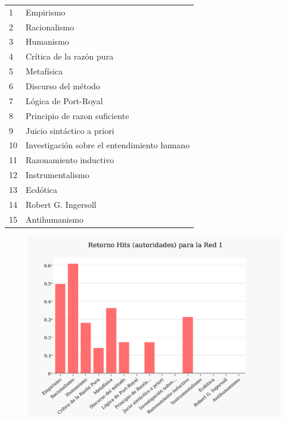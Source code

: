\documentclass[a4paper]{article}
\begin{document}
\begin{tabular}{l l}
1 & Empirismo \\
2 & Racionalismo \\
3 & Humanismo \\
4 & Crítica de la razón pura \\
5 & Metafísica \\
6 & Discurso del método \\
7 & Lógica de Port-Royal \\
8 & Principio de razon suficiente \\
9 & Juicio sintáctico a priori \\
10 & Investigación sobre el entendimiento humano \\
11 & Razonamiento inductivo \\
12 & Instrumentalismo \\
13 & Ecdótica \\
14 & Robert G. Ingersoll \\
15 & Antihumanismo \\
\end{tabular}


\begin{figure}
  \begin{center}
	\includegraphics[scale=0.66]{imagenes/Exp1/hitsA1}
	\label{hitsa1}
  \end{center}
\end{figure}
\end{document}
